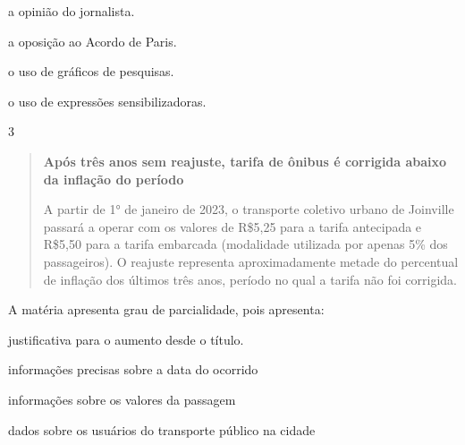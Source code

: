 \begin{escolha}

  \item a opinião do jornalista.
  
  \item a oposição ao Acordo de Paris.
  
  \item o uso de gráficos de pesquisas.
  
  \item o uso de expressões sensibilizadoras.

\end{escolha}


\num{3}

\begin{quote}

\textbf{Após três anos sem reajuste, tarifa de ônibus é corrigida abaixo da
inflação do período}

A partir de 1° de janeiro de 2023, o transporte coletivo urbano de
Joinville passará a operar com os valores de R\$5,25 para a tarifa
antecipada e R\$5,50 para a tarifa embarcada (modalidade utilizada por
apenas 5\% dos passageiros). O reajuste representa aproximadamente
metade do percentual de inflação dos últimos três anos, período no qual
a tarifa não foi corrigida.

\end{quote}


A matéria apresenta grau de parcialidade, pois apresenta:

\begin{escolha}
  
  \item justificativa para o aumento desde o título.
  
  \item informações precisas sobre a data do ocorrido
  
  \item informações sobre os valores da passagem
  
  \item dados sobre os usuários do transporte público na cidade

\end{escolha}


